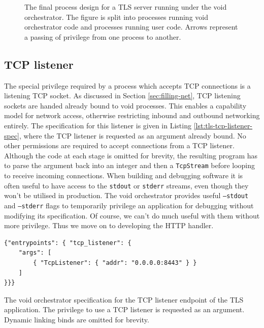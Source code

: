 \documentclass[12pt,a4paper,twoside]{report}
\begin{document}
\begin{figure}
    \centering
    

    \caption{The final process design for a TLS server running under the void orchestrator. The figure is split into processes running void orchestrator code and processes running user code. Arrows represent a passing of privilege from one process to another.}
    \label{fig:tls-server-processes}
\end{figure}

\subsection{TCP listener}
\label{sec:building-tls-tcp-listener}

The special privilege required by a process which accepts TCP connections is a listening TCP socket. As discussed in Section \ref{sec:filling-net}, TCP listening sockets are handed already bound to void processes. This enables a capability model for network access, otherwise restricting inbound and outbound networking entirely. The specification for this listener is given in Listing \ref{lst:tls-tcp-listener-spec}, where the TCP listener is requested as an argument already bound. No other permissions are required to accept connections from a TCP listener. Although the code at each stage is omitted for brevity, the resulting program has to parse the argument back into an integer and then a \texttt{TcpStream} before looping to receive incoming connections. When building and debugging software it is often useful to have access to the \texttt{stdout} or \texttt{stderr} streams, even though they won't be utilised in production. The void orchestrator provides useful \texttt{--stdout} and \texttt{--stderr} flags to temporarily privilege an application for debugging without modifying its specification. Of course, we can't do much useful with them without more privilege. Thus we move on to developing the HTTP handler.

\begin{listing}
\begin{verbatim}
{"entrypoints": { "tcp_listener": {
	"args": [
		{ "TcpListener": { "addr": "0.0.0.0:8443" } }
	]
}}}
\end{verbatim}

\caption{The void orchestrator specification for the TCP listener endpoint of the TLS application. The privilege to use a TCP listener is requested as an argument. Dynamic linking binds are omitted for brevity.}
\label{lst:tls-tcp-listener-spec}
\end{listing}
\end{document}
